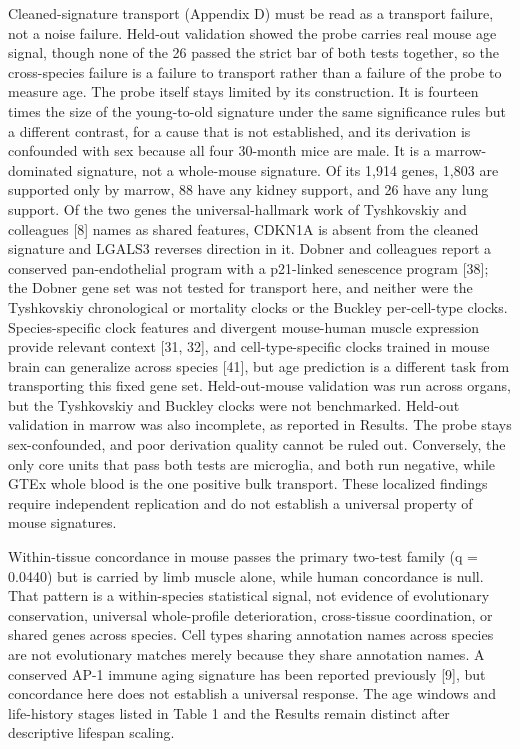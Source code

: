 \documentclass[11pt]{article}
\begin{document}
Cleaned-signature transport (Appendix D) must be read as a transport failure, not a noise failure. Held-out validation showed the probe carries real mouse age signal, though none of the 26 passed the strict bar of both tests together, so the cross-species failure is a failure to transport rather than a failure of the probe to measure age. The probe itself stays limited by its construction. It is fourteen times the size of the young-to-old signature under the same significance rules but a different contrast, for a cause that is not established, and its derivation is confounded with sex because all four 30-month mice are male. It is a marrow-dominated signature, not a whole-mouse signature. Of its 1,914 genes, 1,803 are supported only by marrow, 88 have any kidney support, and 26 have any lung support. Of the two genes the universal-hallmark work of Tyshkovskiy and colleagues [8] names as shared features, CDKN1A is absent from the cleaned signature and LGALS3 reverses direction in it. Dobner and colleagues report a conserved pan-endothelial program with a p21-linked senescence program [38]; the Dobner gene set was not tested for transport here, and neither were the Tyshkovskiy chronological or mortality clocks or the Buckley per-cell-type clocks. Species-specific clock features and divergent mouse-human muscle expression provide relevant context [31, 32], and cell-type-specific clocks trained in mouse brain can generalize across species [41], but age prediction is a different task from transporting this fixed gene set. Held-out-mouse validation was run across organs, but the Tyshkovskiy and Buckley clocks were not benchmarked. Held-out validation in marrow was also incomplete, as reported in Results. The probe stays sex-confounded, and poor derivation quality cannot be ruled out. Conversely, the only core units that pass both tests are microglia, and both run negative, while GTEx whole blood is the one positive bulk transport. These localized findings require independent replication and do not establish a universal property of mouse signatures.

Within-tissue concordance in mouse passes the primary two-test family (q = 0.0440) but is carried by limb muscle alone, while human concordance is null. That pattern is a within-species statistical signal, not evidence of evolutionary conservation, universal whole-profile deterioration, cross-tissue coordination, or shared genes across species. Cell types sharing annotation names across species are not evolutionary matches merely because they share annotation names. A conserved AP-1 immune aging signature has been reported previously [9], but concordance here does not establish a universal response. The age windows and life-history stages listed in Table 1 and the Results remain distinct after descriptive lifespan scaling.
\end{document}
